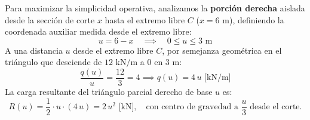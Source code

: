 Para maximizar la simplicidad operativa, analizamos la \textbf{porción derecha} aislada desde la sección de corte $x$ hasta el extremo libre $C$ ($x = 6\text{ m}$), definiendo la coordenada auxiliar medida desde el extremo libre:
\begin{equation}
    u = 6 - x \quad \implies \quad 0 \le u \le 3\text{ m}
\end{equation}
A una distancia $u$ desde el extremo libre $C$, por semejanza geométrica en el triángulo que desciende de $12\text{ kN/m}$ a $0$ en $3\text{ m}$:
\begin{equation}
    \frac{q(u)}{u} = \frac{12}{3} = 4 \implies q(u) = 4\,u\text{ [kN/m]}
\end{equation}
La carga resultante del triángulo parcial derecho de base $u$ es:
\begin{equation}
    R(u) = \frac{1}{2} \cdot u \cdot (4\,u) = 2\,u^2\text{ [kN]}, \quad \text{con centro de gravedad a } \frac{u}{3} \text{ desde el corte.}
\end{equation}

